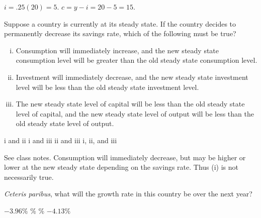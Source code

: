 \documentclass[addpoints,11pt]{exam}
\theoremstyle{definition}
\begin{document}
\begin{questions}
			
		\begin{solution}
			$i=.25(20) = 5$. $c = y - i = 20 - 5 = 15$.
		\end{solution}
			
			\question Suppose a country is currently at its steady state. If the country decides to permanently decrease its savings rate, which of the following must be true?
			
			
			\begin{enumerate}[i.]
				\item Consumption will immediately increase, and the new steady state consumption level will be greater than the old steady state consumption level.
				\item Investment will immediately decrease, and the new steady state investment level will be less than the old steady state investment level.
				\item The new steady state level of capital will be less than the old steady state level of capital, and the new steady state level of output will be less than the old steady state level of output.
			\end{enumerate}
			
			\begin{choices}
				\choice i and ii
				\choice i and iii
				\CorrectChoice ii and iii
				\choice i, ii, and iii
			\end{choices}
			
			\begin{solution}
				See class notes. Consumption will immediately decrease, but may be higher or lower at the new steady state depending on the savings rate. Thus (i) is not necessarily true.
			\end{solution}
			

		
		
	
			
			\question \label{blah1} \textit{Ceteris paribus}, what will the growth rate in this country be over the next year?
			
			\begin{choices}
				\CorrectChoice $-3.96\%$
				\choice 10\%
				\choice 2.4\%
				\choice $-4.13\%$
			\end{choices}
			

\end{questions}
\end{document}

